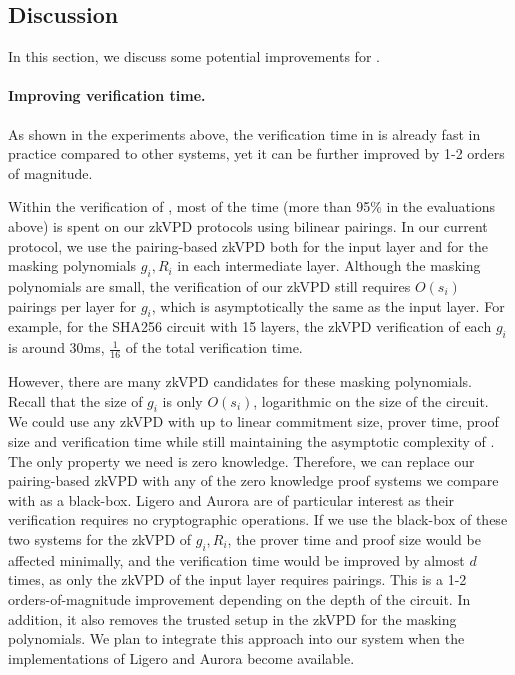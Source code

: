 \subsection{Discussion}

In this section, we discuss some potential improvements for \name.


\paragraph{Improving verification time.} As shown in the experiments above, the verification time in \name is already fast in practice compared to other systems, yet it can be further improved by 1-2 orders of magnitude. 

Within the verification of \name, most of the time (more than 95\% in the evaluations above) is spent on our zkVPD protocols using bilinear pairings. In our current protocol, we use the pairing-based zkVPD both for the input layer and for the masking polynomials $g_i, R_i$ in each intermediate layer. Although the masking polynomials are small, the verification of our zkVPD still requires $O(s_i)$ pairings per layer for $g_i$, which is asymptotically the same as the input layer. For example, for the SHA256 circuit with 15 layers, the zkVPD verification of each $g_i$ is around 30ms, $\frac{1}{16}$ of the total verification time.

However, there are many zkVPD candidates for these masking polynomials. Recall that the size of $g_i$ is only $O(s_i)$, logarithmic on the size of the circuit. We could use any zkVPD with up to linear commitment size, prover time, proof size and verification time while still maintaining the asymptotic complexity of \name. The only property we need is zero knowledge. Therefore, we can replace our pairing-based zkVPD with any of the zero knowledge proof systems we compare with as a black-box. Ligero and Aurora are of particular interest as their verification requires no cryptographic operations. If we use the black-box of these two systems for the zkVPD of $g_i, R_i$, the prover time and proof size would be affected minimally, and the verification time would be improved by almost $d$ times, as only the zkVPD of the input layer requires pairings. This is a 1-2 orders-of-magnitude improvement depending on the depth of the circuit. In addition, it also removes the trusted setup in the zkVPD for the masking polynomials. We plan to integrate this approach into our system when the implementations of Ligero and Aurora become available.  


